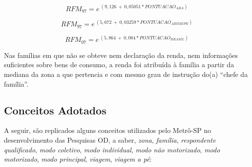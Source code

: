 \begin{equation}\label{eq:reg-renda-87}
RFM_{87} = e^{~(9,126~+~0,05051*PONTUACAO_{ABA})}
\end{equation}

\begin{equation}\label{eq:reg-renda-97}
RFM_{97} = e^{~(5,672~+~0,03259*PONTUACAO_{ABIMEPE})}
\end{equation}

\begin{equation}\label{eq:reg-renda-07}
RFM_{07} = e^{~(5,864~+~0,084*PONTUACAO_{BRASIL})}
\end{equation}


Nas famílias em que não se obteve nem declaração da renda, nem informações suficientes sobre bens de consumo, a renda foi atribuída à família a partir da mediana da zona a que pertencia e com mesmo grau de instrução do(a) ``chefe da família''.


\subsection{Conceitos Adotados}\label{subsec:conceitos}

A seguir, são replicados alguns conceitos utilizados pelo Metrô-SP no desenvolvimento das Pesquisas OD, a saber, \emph{zona}, \emph{família}, \emph{respondente qualificado}, \emph{modo coletivo}, \emph{modo individual}, \emph{modo não motorizado}, \emph{modo motorizado}, \emph{modo principal}, \emph{viagem}, \emph{viagem a pé}: 

